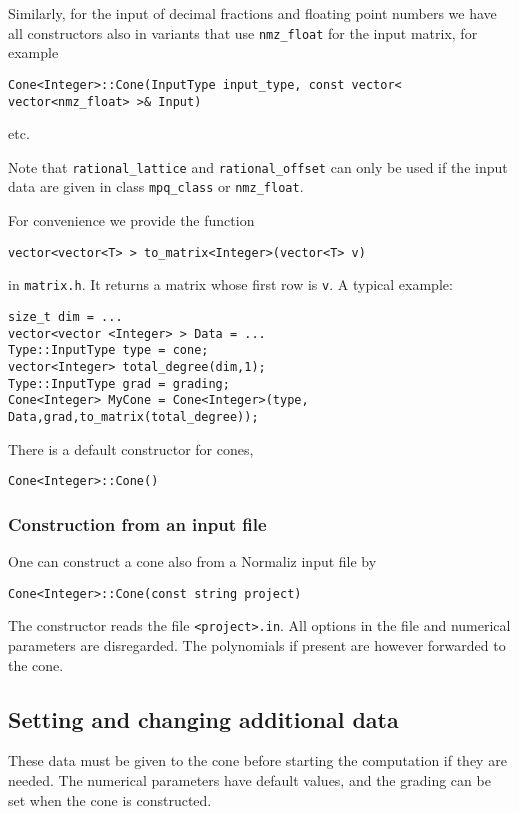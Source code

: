 \begin{small}
Similarly, for the input of decimal fractions and floating point numbers we have all constructors also in variants that use \verb|nmz_float| for the input matrix, for example
\begin{Verbatim}
Cone<Integer>::Cone(InputType input_type, const vector< vector<nmz_float> >& Input)
\end{Verbatim}
etc.

Note that \verb|rational_lattice| and \verb|rational_offset| can only be used if the input data are given in class \verb|mpq_class| or \verb|nmz_float|.

For convenience we provide the function
\begin{Verbatim}
vector<vector<T> > to_matrix<Integer>(vector<T> v)
\end{Verbatim}
in \verb|matrix.h|. It returns a matrix whose first row is \verb|v|. A typical example:
\begin{Verbatim}
size_t dim = ...
vector<vector <Integer> > Data = ...
Type::InputType type = cone;
vector<Integer> total_degree(dim,1);
Type::InputType grad = grading;
Cone<Integer> MyCone = Cone<Integer>(type, Data,grad,to_matrix(total_degree));
\end{Verbatim}

There is a default constructor for cones,
\begin{Verbatim}
Cone<Integer>::Cone()
\end{Verbatim}

\subsubsection{Construction from an input file}

One can construct a cone also from a Normaliz input file by
\begin{Verbatim}
Cone<Integer>::Cone(const string project)
\end{Verbatim}
The constructor reads the file \verb|<project>.in|. All options in the file and numerical parameters are disregarded. The polynomials if present are however forwarded to the cone.

\subsection{Setting and changing additional data}

These data must be given to the cone before starting the computation if they are needed.
The numerical parameters have default values, and the grading can be set when the cone is constructed.


\end{small}
